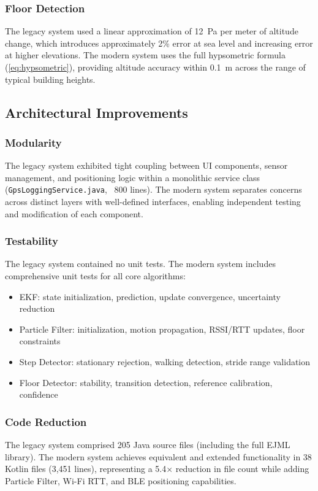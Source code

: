 \documentclass[journal,twocolumn]{IEEEtran}
\begin{document}
\subsubsection{Floor Detection}
The legacy system used a linear approximation of 12~Pa per meter of altitude change, which introduces approximately 2\% error at sea level and increasing error at higher elevations. The modern system uses the full hypsometric formula (\ref{eq:hypsometric}), providing altitude accuracy within 0.1~m across the range of typical building heights.

\subsection{Architectural Improvements}

\subsubsection{Modularity}
The legacy system exhibited tight coupling between UI components, sensor management, and positioning logic within a monolithic service class (\texttt{GpsLoggingService.java}, ~800 lines). The modern system separates concerns across distinct layers with well-defined interfaces, enabling independent testing and modification of each component.

\subsubsection{Testability}
The legacy system contained no unit tests. The modern system includes comprehensive unit tests for all core algorithms:
\begin{itemize}
    \item EKF: state initialization, prediction, update convergence, uncertainty reduction
    \item Particle Filter: initialization, motion propagation, RSSI/RTT updates, floor constraints
    \item Step Detector: stationary rejection, walking detection, stride range validation
    \item Floor Detector: stability, transition detection, reference calibration, confidence
\end{itemize}

\subsubsection{Code Reduction}
The legacy system comprised 205 Java source files (including the full EJML library). The modern system achieves equivalent and extended functionality in 38 Kotlin files (3,451 lines), representing a 5.4$\times$ reduction in file count while adding Particle Filter, Wi-Fi RTT, and BLE positioning capabilities.
\end{document}

